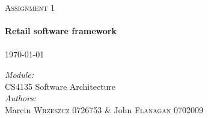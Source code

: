 \begin{titlepage}
 
\begin{center}
 
 
 
 
\textsc{\LARGE Assignment 1}\\[3.5cm]
 
 
\HRule \\[0.6cm]
{ \huge \bfseries Retail software framework}\\[0.4cm]
 
\HRule \\[4.0cm]
 {\large \today}\\[9.0cm]

\begin{flushleft} \large
\emph{Module:}\\
CS4135 Software Architecture
\\[0.4cm]
\emph{Authors:}\\
Marcin \textsc{Wrzeszcz} 0726753 \& John \textsc{Flanagan} 0702009
\end{flushleft}

 
\vfill
 

 
\end{center}
 
\end{titlepage}
